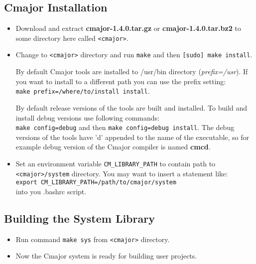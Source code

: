 \documentclass[oneside, a4paper, 11pt]{article}
\begin{document}
\subsection{Cmajor Installation}

\begin{itemize}

\item
Download and extract \textbf{cmajor-1.4.0.tar.gz} or \textbf{cmajor-1.4.0.tar.bz2}
to some directory here called \verb|<cmajor>|.

\item
Change to \verb|<cmajor>| directory and run \verb|make| and then \verb|[sudo] make install|.

By default Cmajor tools are installed to /usr/bin directory (\emph{prefix=/usr}).
If you want to install to a different path you can use the prefix setting:\\
\verb|make prefix=/where/to/install install|.

By default release versions of the tools are built and installed.
To build and install debug versions use following commands:\\
\verb|make config=debug| and then \verb|make config=debug install|.
The debug versions of the tools have 'd' appended to the name of the executable, so
for example debug version of the Cmajor compiler is named \textbf{cmcd}.

\item
Set an environment variable \verb|CM_LIBRARY_PATH| to contain path to \verb|<cmajor>/system| directory.
You may want to insert a statement like:\\
\verb|export CM_LIBRARY_PATH=/path/to/cmajor/system|\\
into you .bashrc script.

\end{itemize}

\subsection{Building the System Library}

\begin{itemize}

\item
Run command \verb|make sys| from \verb|<cmajor>| directory.

\item
Now the Cmajor system is ready for building user projects.

\end{itemize}
\end{document}
